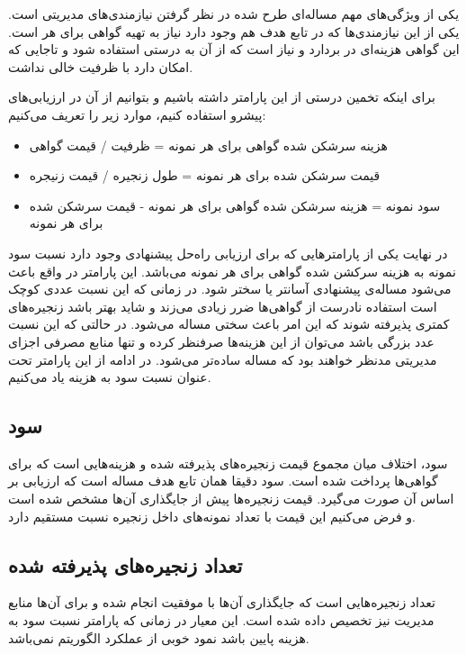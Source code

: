 یکی از ویژگی‌های مهم مساله‌ای طرح شده در نظر گرفتن نیازمندی‌های مدیریتی است. یکی از این نیازمندی‌ها که در تابع هدف هم
وجود دارد نیاز به تهیه گواهی برای هر  است.
این گواهی هزینه‌ای در بردارد و نیاز است که از آن به درستی استفاده شود
و تاجایی که امکان دارد  با ظرفیت خالی نداشت.

برای اینکه تخمین درستی از این پارامتر داشته باشیم و بتوانیم از آن در ارزیابی‌های پیشرو استفاده کنیم، موارد زیر را تعریف می‌کنیم:
    
\begin{itemize}
    \item هزینه سرشکن شده گواهی برای هر نمونه = ظرفیت / قیمت گواهی
    \item قیمت سرشکن شده برای هر نمونه = طول زنجیره / قیمت زنیجره
    \item سود نمونه = هزینه سرشکن شده گواهی برای هر نمونه - قیمت سرشکن شده برای هر نمونه
\end{itemize}

در نهایت یکی از پارامترهایی که برای ارزیابی راه‌حل پیشنهادی وجود دارد
نسبت سود نمونه به هزینه سرکشن شده گواهی برای هر نمونه می‌باشد.
این پارامتر در واقع باعث می‌شود مساله‌ی پیشنهادی آسانتر یا سختر شود.
در زمانی که این نسبت عددی کوچک است استفاده نادرست از گواهی‌ها ضرر زیادی می‌زند و شاید بهتر باشد زنجیره‌های کمتری پذیرفته شوند
که این امر باعث سختی مساله می‌شود.
در حالتی که این نسبت عدد بزرگی باشد می‌توان از این هزینه‌ها صرفنظر کرده و تنها منابع مصرفی اجزای مدیریتی مدنظر خواهند بود که مساله ساده‌تر می‌شود.
در ادامه از این پارامتر تحت عنوان نسبت سود به هزینه یاد می‌کنیم.

\subsection{سود}

سود، اختلاف میان مجموع قیمت زنجیره‌های پذیرفته شده و هزینه‌هایی است که برای گواهی‌ها پرداخت شده است. سود دقیقا همان تابع هدف مساله است که ارزیابی بر اساس آن صورت می‌گیرد. قیمت زنجیره‌ها پیش از جایگذاری آن‌ها مشخص شده است و فرض می‌کنیم این قیمت با تعداد نمونه‌های داخل زنجیره نسبت مستقیم دارد.

\subsection{تعداد زنجیره‌های پذیرفته شده}

تعداد زنجیره‌هایی است که جایگذاری آن‌ها با موفقیت انجام شده و برای آن‌ها منابع مدیریت نیز تخصیص داده شده است. این معیار در زمانی که پارامتر نسبت سود به هزینه پایین باشد نمود خوبی از عملکرد الگوریتم نمی‌باشد.

